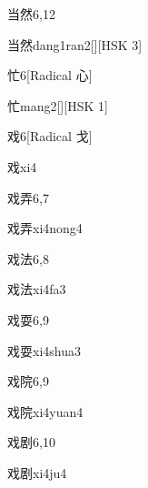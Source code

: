 \begin{entry}{当然}{6,12}
  \begin{phonetics}{当然}{dang1ran2}[][HSK 3]
  \end{phonetics}
\end{entry}

\begin{entry}{忙}{6}[Radical 心]
  \begin{phonetics}{忙}{mang2}[][HSK 1]
  \end{phonetics}
\end{entry}

\begin{entry}{戏}{6}[Radical 戈]
  \begin{phonetics}{戏}{xi4}
  \end{phonetics}
\end{entry}

\begin{entry}{戏弄}{6,7}
  \begin{phonetics}{戏弄}{xi4nong4}
  \end{phonetics}
\end{entry}

\begin{entry}{戏法}{6,8}
  \begin{phonetics}{戏法}{xi4fa3}
  \end{phonetics}
\end{entry}

\begin{entry}{戏耍}{6,9}
  \begin{phonetics}{戏耍}{xi4shua3}
  \end{phonetics}
\end{entry}

\begin{entry}{戏院}{6,9}
  \begin{phonetics}{戏院}{xi4yuan4}
  \end{phonetics}
\end{entry}

\begin{entry}{戏剧}{6,10}
  \begin{phonetics}{戏剧}{xi4ju4}
  \end{phonetics}
\end{entry}

